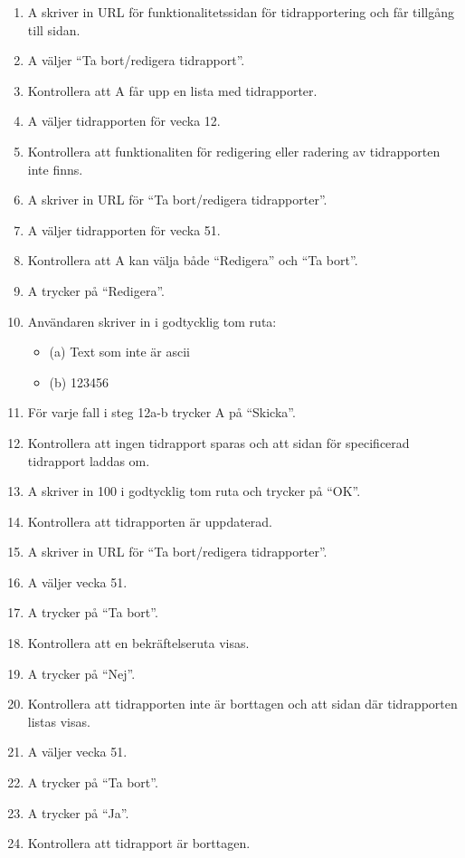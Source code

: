 \documentclass[a4paper]{article}
\begin{document}
\begin{ST}
\begin{enumerate}
\item A skriver in URL för funktionalitetssidan för tidrapportering och får tillgång till sidan.
\item A väljer ``Ta bort/redigera tidrapport''.
\item Kontrollera att A får upp en lista med tidrapporter.
\item A väljer tidrapporten för vecka 12.
\item Kontrollera att funktionaliten för redigering eller radering av tidrapporten inte finns.\\
\item A skriver in URL för ``Ta bort/redigera tidrapporter''.
\item A väljer tidrapporten för vecka 51.
\item Kontrollera att A kan välja både ``Redigera'' och ``Ta bort''.
\item A trycker på ``Redigera''.
\item Användaren skriver in i godtycklig tom ruta:
\begin{itemize}
\item[] (a) Text som inte är ascii
\item[] (b) 123456
\end{itemize}
\item För varje fall i steg 12a-b trycker A på ``Skicka''. 
\item Kontrollera att ingen tidrapport sparas och att sidan för specificerad tidrapport laddas om.
\item A skriver in 100 i godtycklig tom ruta och trycker på ``OK''.
\item Kontrollera att tidrapporten är uppdaterad.
\item A skriver in URL för ``Ta bort/redigera tidrapporter''.
\item A väljer vecka 51.
\item A trycker på ``Ta bort''.
\item Kontrollera att en bekräftelseruta visas.
\item A trycker på ``Nej''.
\item Kontrollera att tidrapporten inte är borttagen och att sidan där tidrapporten listas visas.
\item A väljer vecka 51.
\item A trycker på ``Ta bort''.
\item A trycker på ``Ja''.
\item Kontrollera att tidrapport är borttagen.
\end{enumerate}


\end{ST}
\end{document}
